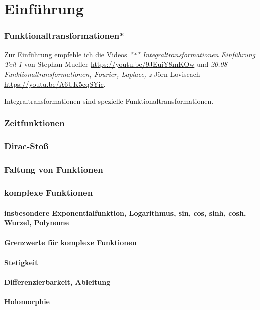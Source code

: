 \part{Einführung}
\section{Funktionaltransformationen*}
Zur Einführung empfehle ich die Videos \textit{*** Integraltransformationen Einführung Teil 1} von Stephan Mueller \url{https://youtu.be/9JEuiY8mKOw} und \textit{20.08 Funktionaltransformationen, Fourier, Laplace, z} Jörn Loviscach \url{https://youtu.be/A6UK5cqSYic}.

Integraltransformationen sind spezielle Funktionaltransformationen.



\section{Zeitfunktionen}
\section{Dirac-Stoß}
\section{Faltung von Funktionen}
\section{komplexe Funktionen}
\subsection{insbesondere Exponentialfunktion, Logarithmus, sin, cos, sinh, cosh, Wurzel, Polynome}
\subsection{Grenzwerte für komplexe Funktionen}
\subsection{Stetigkeit}
\subsection{Differenzierbarkeit, Ableitung}
\subsection{Holomorphie}
